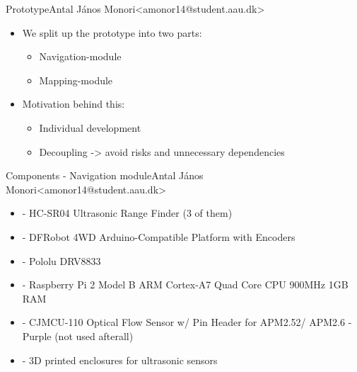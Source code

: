 \begin{frame}{Prototype}{Antal János Monori\newline<amonor14@student.aau.dk>}
	\begin{itemize}
		\item We split up the prototype into two parts:
		\begin{itemize}
			\item <2-> Navigation-module
			\item <3-> Mapping-module
		\end{itemize}
		\item <4-> Motivation behind this:
		\begin{itemize}
			\item <5-> Individual development
			\item <6-> Decoupling -> avoid risks and unnecessary dependencies
		\end{itemize}
	\end{itemize}
\end{frame}

\begin{frame}{Components - Navigation module}{Antal János Monori\newline<amonor14@student.aau.dk>}
	\begin{itemize}
		\item - HC-SR04 Ultrasonic Range Finder (3 of them)
		\item - DFRobot 4WD Arduino-Compatible Platform with Encoders
		\item - Pololu DRV8833		
		\item - Raspberry Pi 2 Model B ARM Cortex-A7 Quad Core CPU 900MHz 1GB RAM 
		\item - CJMCU-110 Optical Flow Sensor w/ Pin Header for APM2.52/ APM2.6 - Purple	(not used afterall)
		\item - 3D printed enclosures for ultrasonic sensors
	\end{itemize}
\end{frame}

